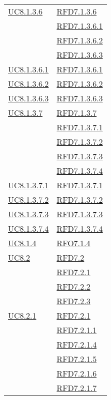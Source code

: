 \begin{longtable}{|>{\centering}m{5cm}|m{5cm}<{\centering}|}
\hyperref[UC8.1.3.6]{UC8.1.3.6} & \hyperlink{RFD7.1.3.6}{RFD7.1.3.6}\\
& \hyperlink{RFD7.1.3.6.1}{RFD7.1.3.6.1}\\
& \hyperlink{RFD7.1.3.6.2}{RFD7.1.3.6.2}\\
& \hyperlink{RFD7.1.3.6.3}{RFD7.1.3.6.3}\\ \hline
\hyperref[UC8.1.3.6.1]{UC8.1.3.6.1} & \hyperlink{RFD7.1.3.6.1}{RFD7.1.3.6.1}\\ \hline
\hyperref[UC8.1.3.6.2]{UC8.1.3.6.2} & \hyperlink{RFD7.1.3.6.2}{RFD7.1.3.6.2}\\ \hline
\hyperref[UC8.1.3.6.3]{UC8.1.3.6.3} & \hyperlink{RFD7.1.3.6.3}{RFD7.1.3.6.3}\\ \hline
\hyperref[UC8.1.3.7]{UC8.1.3.7} & \hyperlink{RFD7.1.3.7}{RFD7.1.3.7}\\
& \hyperlink{RFD7.1.3.7.1}{RFD7.1.3.7.1}\\
& \hyperlink{RFD7.1.3.7.2}{RFD7.1.3.7.2}\\
& \hyperlink{RFD7.1.3.7.3}{RFD7.1.3.7.3}\\
& \hyperlink{RFD7.1.3.7.4}{RFD7.1.3.7.4}\\ \hline
\hyperref[UC8.1.3.7.1]{UC8.1.3.7.1} & \hyperlink{RFD7.1.3.7.1}{RFD7.1.3.7.1}\\ \hline
\hyperref[UC8.1.3.7.2]{UC8.1.3.7.2} & \hyperlink{RFD7.1.3.7.2}{RFD7.1.3.7.2}\\ \hline
\hyperref[UC8.1.3.7.3]{UC8.1.3.7.3} & \hyperlink{RFD7.1.3.7.3}{RFD7.1.3.7.3}\\ \hline
\hyperref[UC8.1.3.7.4]{UC8.1.3.7.4} & \hyperlink{RFD7.1.3.7.4}{RFD7.1.3.7.4}\\ \hline
\hyperref[UC8.1.4]{UC8.1.4} & \hyperlink{RFO7.1.4}{RFO7.1.4}\\ \hline
\hyperref[UC8.2]{UC8.2} & \hyperlink{RFD7.2}{RFD7.2}\\
& \hyperlink{RFD7.2.1}{RFD7.2.1}\\
& \hyperlink{RFD7.2.2}{RFD7.2.2}\\
& \hyperlink{RFD7.2.3}{RFD7.2.3}\\ \hline
\hyperref[UC8.2.1]{UC8.2.1} & \hyperlink{RFD7.2.1}{RFD7.2.1}\\
& \hyperlink{RFD7.2.1.1}{RFD7.2.1.1}\\
& \hyperlink{RFD7.2.1.4}{RFD7.2.1.4}\\
& \hyperlink{RFD7.2.1.5}{RFD7.2.1.5}\\
& \hyperlink{RFD7.2.1.6}{RFD7.2.1.6}\\
& \hyperlink{RFD7.2.1.7}{RFD7.2.1.7}\\

\end{longtable}
